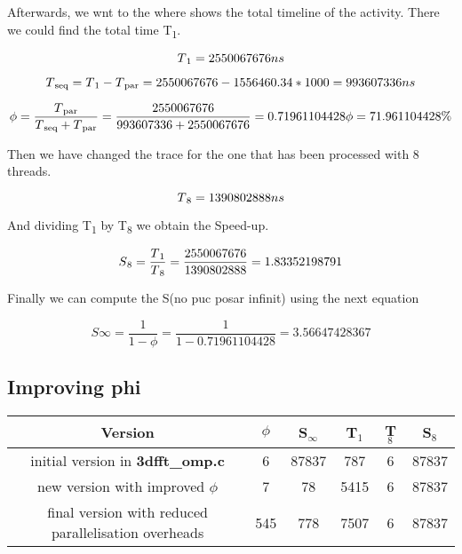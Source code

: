 \documentclass[12pt, a4paper]{article}
\begin{document}
Afterwards, we wnt to the where shows the total timeline of the activity. There we could find the total time T\textsubscript{1}.

\begin{equation}
	T\textsubscript{1} = 2550067676 ns
\end{equation}

\begin{equation}
	T\textsubscript{seq} = T\textsubscript{1} - T\textsubscript{par} = 2550067676 - 1556460.34*1000 = 993607336 ns
\end{equation}

\begin{equation}
	\phi = \dfrac{T\textsubscript{par}} {T\textsubscript{seq} + T\textsubscript{par}} = \dfrac{2550067676} {993607336 + 2550067676} = 0.71961104428
	\phi = 71.961104428\%
\end{equation}

Then we have changed the trace for the one that has been processed with 8 threads.

\begin{equation}
	T\textsubscript{8} = 1390802888 ns
\end{equation}

And dividing T\textsubscript{1} by T\textsubscript{8} we obtain the Speed-up.

\begin{equation}
	S\textsubscript{8} = \dfrac{T\textsubscript{1}}{T\textsubscript{8}} = \dfrac{2550067676} {1390802888} = 1.83352198791
\end{equation}


Finally we can compute the S(no puc posar infinit) using the next equation

\begin{equation}
	S\infty = \dfrac{1}{1 - \phi} = \dfrac{1} {1-0.71961104428} = 3.56647428367
\end{equation}

\subsection{Improving phi}

\begin{center}
 \begin{tabular}{|c || c | c || c | c | c|} 
 \hline
 \textbf{Version} & $\phi$ & S$_\infty$ & T$_1$ & T$_8$ & S$_8$ \\
 \hline\hline
 initial version in \textbf{3dfft\_omp.c} & 6 & 87837 & 787 & 6 & 87837 \\ 
 \hline
 new version with improved $\phi$ & 7 & 78 & 5415 & 6 & 87837 \\
 \hline
 final version with reduced parallelisation overheads & 545 & 778 & 7507 & 6 & 87837 \\
 \hline
\end{tabular}
\end{center}
\end{document}
